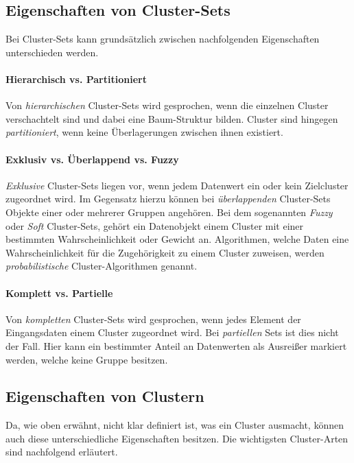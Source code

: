 \subsection{Eigenschaften von Cluster-Sets}

Bei Cluster-Sets kann grundsätzlich zwischen nachfolgenden Eigenschaften unterschieden werden.

\paragraph{Hierarchisch vs. Partitioniert}
Von \textit{hierarchischen} Cluster-Sets wird gesprochen, wenn die einzelnen Cluster verschachtelt sind und dabei eine
Baum-Struktur bilden. Cluster sind hingegen \textit{partitioniert}, wenn keine Überlagerungen zwischen ihnen existiert.

\paragraph{Exklusiv vs. Überlappend vs. Fuzzy}
\textit{Exklusive} Cluster-Sets liegen vor, wenn jedem Datenwert ein oder kein Zielcluster zugeordnet wird.
Im Gegensatz hierzu können bei \textit{überlappenden} Cluster-Sets Objekte einer oder mehrerer Gruppen angehören.
Bei dem sogenannten \textit{Fuzzy} oder \textit{Soft} Cluster-Sets, gehört ein Datenobjekt einem Cluster
mit einer bestimmten Wahrscheinlichkeit oder Gewicht an. Algorithmen, welche Daten eine
Wahrscheinlichkeit für die Zugehörigkeit zu einem Cluster zuweisen, werden \textit{probabilistische}
Cluster-Algorithmen genannt.

\paragraph{Komplett vs. Partielle}
Von \textit{kompletten} Cluster-Sets wird gesprochen, wenn jedes Element der Eingangsdaten einem Cluster zugeordnet wird.
Bei \textit{partiellen} Sets ist dies nicht der Fall. Hier kann ein bestimmter Anteil an Datenwerten als Ausreißer markiert
werden, welche keine Gruppe besitzen.


\subsection{Eigenschaften von Clustern}

Da, wie oben erwähnt, nicht klar definiert ist, was ein Cluster ausmacht, können auch diese unterschiedliche Eigenschaften
besitzen. Die wichtigsten Cluster-Arten sind nachfolgend erläutert.

